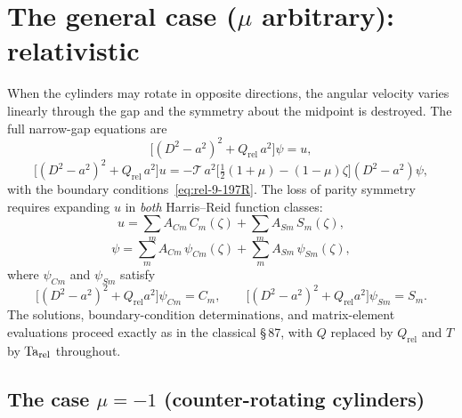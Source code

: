 \section{The general case ($\mu$ arbitrary): relativistic}
\label{sec:rel-89}

When the cylinders may rotate in opposite directions, the angular
velocity varies linearly through the gap and the symmetry about the
midpoint is destroyed.  The full narrow-gap equations are
\begin{equation}
  \bigl[(D^2-a^2)^2 + Q_{\mathrm{rel}}\,a^2\bigr]\psi = u,
  \label{eq:rel-9-267R}
\end{equation}
\begin{equation}
  \bigl[(D^2-a^2)^2 + Q_{\mathrm{rel}}\,a^2\bigr]u
  = -\mathscr{T}\,a^2
    \bigl[\tfrac{1}{2}(1+\mu) - (1-\mu)\zeta\bigr](D^2-a^2)\psi,
  \label{eq:rel-9-268R}
\end{equation}
with the boundary conditions~\eqref{eq:rel-9-197R}.  The loss of parity
symmetry requires expanding $u$ in \emph{both} Harris--Reid function
classes:
\begin{equation}
  u = \sum_m A_{Cm}\,C_m(\zeta) + \sum_m A_{Sm}\,S_m(\zeta),
  \label{eq:rel-9-269R}
\end{equation}
\begin{equation}
  \psi = \sum_m A_{Cm}\,\psi_{Cm}(\zeta)
       + \sum_m A_{Sm}\,\psi_{Sm}(\zeta),
  \label{eq:rel-9-270R}
\end{equation}
where $\psi_{Cm}$ and $\psi_{Sm}$ satisfy
\begin{equation}
  \bigl[(D^2-a^2)^2+Q_{\mathrm{rel}}a^2\bigr]\psi_{Cm} = C_m,
  \qquad
  \bigl[(D^2-a^2)^2+Q_{\mathrm{rel}}a^2\bigr]\psi_{Sm} = S_m.
  \label{eq:rel-9-271-272R}
\end{equation}
The solutions, boundary-condition determinations, and matrix-element
evaluations proceed exactly as in the classical \S\,87, with $Q$
replaced by $Q_{\mathrm{rel}}$ and $T$ by $\mathrm{Ta}_{\mathrm{rel}}$
throughout.

\subsection{The case $\mu = -1$ (counter-rotating cylinders)}
\label{sec:rel-89-mu-m1}


